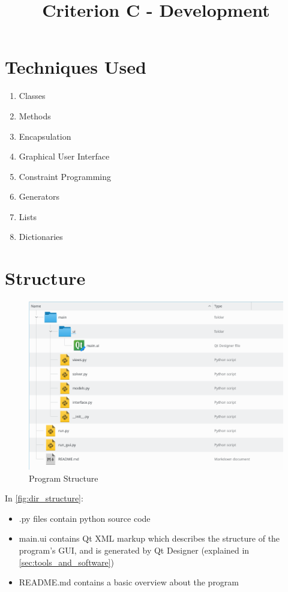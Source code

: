 \documentclass[12pt]{article}
\title{Criterion C - Development}
\author{}
\date{}
\begin{document}
\maketitle

\section{Techniques Used}

\begin{enumerate}
    \item Classes
    \item Methods
    \item Encapsulation
    \item Graphical User Interface
    \item Constraint Programming
    \item Generators
    \item Lists
    \item Dictionaries
\end{enumerate}

\section{Structure}

%
\begin{figure}[H]
    \caption{Program Structure}
    \label{fig:dir_structure}
    \includegraphics[height=0.4\textheight]{directory_structure}
\end{figure}

In \autoref{fig:dir_structure}:
\begin{itemize}
    \item .py files contain python source code 
    \item main.ui contains Qt XML markup which describes the structure of the program's GUI,
        and is generated by Qt Designer (explained in \autoref{sec:tools_and_software}) 
    \item README.md contains a basic overview about the program 
\end{itemize}
\end{document}
